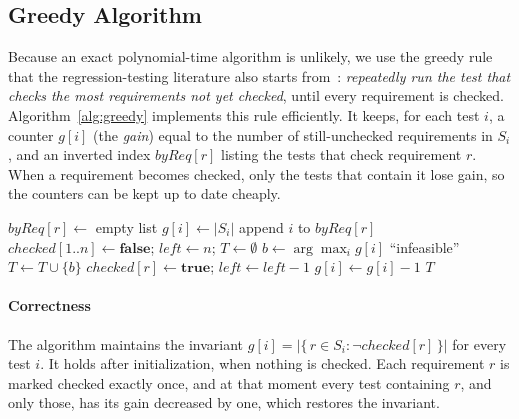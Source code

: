 \documentclass[conference]{IEEEtran}
\theoremstyle{definition}
\theoremstyle{remark}
\begin{document}
\subsection{Greedy Algorithm}
Because an exact polynomial-time algorithm is unlikely, we use the greedy rule
that the regression-testing literature also starts from~\cite{yoo2012}:
\emph{repeatedly run the test that checks the most requirements not yet
checked}, until every requirement is checked. Algorithm~\ref{alg:greedy}
implements this rule efficiently. It keeps, for each test $i$, a counter
$g[i]$ (the \emph{gain}) equal to the number of still-unchecked requirements in
$S_i$, and an inverted index $\mathit{byReq}[r]$ listing the tests that check
requirement $r$. When a requirement becomes checked, only the tests that
contain it lose gain, so the counters can be kept up to date cheaply.

\begin{algorithm}[t]
\caption{\textsc{GreedyMinimize}$(U, S_1,\dots,S_m)$}
\label{alg:greedy}
\begin{algorithmic}[1]
 $\mathit{byReq}[r] \gets$ empty list
\EndFor
{}
  \State $g[i] \gets |S_i|$
   append $i$ to $\mathit{byReq}[r]$
  \EndFor
\EndFor
\State $\mathit{checked}[1..n] \gets \textbf{false}$;\; $\mathit{left} \gets n$;\; $T \gets \emptyset$
  \State $b \gets \arg\max_{i} g[i]$ 
   \Return ``infeasible'' \EndIf
  \State $T \gets T \cup \{b\}$
    \State $\mathit{checked}[r] \gets \textbf{true}$;\; $\mathit{left} \gets \mathit{left} - 1$
     $g[i] \gets g[i] - 1$
    \EndFor
  \EndFor
\EndWhile
\State \Return $T$
\end{algorithmic}
\end{algorithm}

\paragraph*{Correctness}
The algorithm maintains the invariant
$g[i] = |\{\, r \in S_i : \neg\mathit{checked}[r] \,\}|$ for every test $i$.
It holds after initialization, when nothing is checked. Each requirement $r$
is marked checked exactly once, and at that moment every test containing $r$,
and only those, has its gain decreased by one, which restores the invariant.
\end{document}
